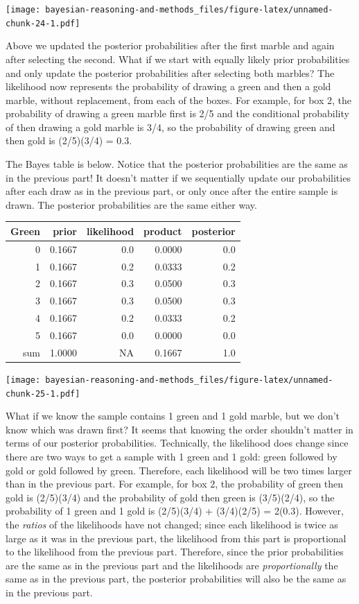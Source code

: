 \documentclass[
]{book}
\theoremstyle{definition}
\theoremstyle{definition}
\theoremstyle{definition}
\theoremstyle{remark}
\begin{document}
\texttt{[image: bayesian-reasoning-and-methods\_files/figure-latex/unnamed-chunk-24-1.pdf]}

Above we updated the posterior probabilities after the first marble and again after selecting the second. What if we start with equally likely prior probabilities and only update the posterior probabilities after selecting both marbles? The likelihood now represents the probability of drawing a green and then a gold marble, without replacement, from each of the boxes. For example, for box 2, the probability of drawing a green marble first is 2/5 and the conditional probability of then drawing a gold marble is 3/4, so the probability of drawing green and then gold is (2/5)(3/4) = 0.3.

The Bayes table is below. Notice that the posterior probabilities are the same as in the previous part! It doesn't matter if we sequentially update our probabilities after each draw as in the previous part, or only once after the entire sample is drawn. The posterior probabilities are the same either way.

\begin{tabular}{r|r|r|r|r}
\hline
Green & prior & likelihood & product & posterior\\
\hline
0 & 0.1667 & 0.0 & 0.0000 & 0.0\\
\hline
1 & 0.1667 & 0.2 & 0.0333 & 0.2\\
\hline
2 & 0.1667 & 0.3 & 0.0500 & 0.3\\
\hline
3 & 0.1667 & 0.3 & 0.0500 & 0.3\\
\hline
4 & 0.1667 & 0.2 & 0.0333 & 0.2\\
\hline
5 & 0.1667 & 0.0 & 0.0000 & 0.0\\
\hline
sum & 1.0000 & NA & 0.1667 & 1.0\\
\hline
\end{tabular}

\texttt{[image: bayesian-reasoning-and-methods\_files/figure-latex/unnamed-chunk-25-1.pdf]}

What if we know the sample contains 1 green and 1 gold marble, but we don't know which was drawn first? It seems that knowing the order shouldn't matter in terms of our posterior probabilities. Technically, the likelihood does change since there are two ways to get a sample with 1 green and 1 gold: green followed by gold or gold followed by green. Therefore, each likelihood will be two times larger than in the previous part. For example, for box 2, the probability of green then gold is (2/5)(3/4) and the probability of gold then green is (3/5)(2/4), so the probability of 1 green and 1 gold is (2/5)(3/4) + (3/4)(2/5) = 2(0.3).
However, the \emph{ratios} of the likelihoods have not changed; since each likelihood is twice as large as it was in the previous part, the likelihood from this part is proportional to the likelihood from the previous part. Therefore, since the prior probabilities are the same as in the previous part and the likelihoods are \emph{proportionally} the same as in the previous part, the posterior probabilities will also be the same as in the previous part.
\end{document}
